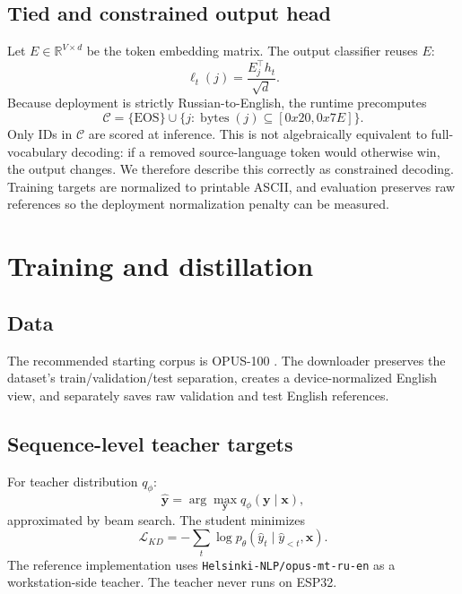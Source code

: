 \documentclass{article}
\newcommand{\R}{\mathbb{R}}
\begin{document}
\subsection{Tied and constrained output head}
Let $E\in\R^{V\times d}$ be the token embedding matrix. The output classifier reuses $E$:
\begin{equation}
\ell_t(j)=\frac{E_j^\top h_t}{\sqrt{d}}.
\end{equation}
Because deployment is strictly Russian-to-English, the runtime precomputes
\begin{equation}
\mathcal{C}
=\{\mathrm{EOS}\}\cup
\{j:\operatorname{bytes}(j)\subseteq[0x20,0x7E]\}.
\end{equation}
Only IDs in $\mathcal{C}$ are scored at inference. This is not algebraically equivalent to full-vocabulary decoding: if a removed source-language token would otherwise win, the output changes. We therefore describe this correctly as constrained decoding. Training targets are normalized to printable ASCII, and evaluation preserves raw references so the deployment normalization penalty can be measured.

\section{Training and distillation}
\subsection{Data}
The recommended starting corpus is OPUS-100 \citep{zhang2020opus100,hf_opus100}. The downloader preserves the dataset's train/validation/test separation, creates a device-normalized English view, and separately saves raw validation and test English references.

\subsection{Sequence-level teacher targets}
For teacher distribution $q_\phi$:
\begin{equation}
\hat{\mathbf{y}}
=\arg\max_{\mathbf{y}}q_\phi(\mathbf{y}\mid\mathbf{x}),
\end{equation}
approximated by beam search. The student minimizes
\begin{equation}
\mathcal{L}_{KD}
=-\sum_t\log p_\theta(
\hat y_t\mid\hat y_{<t},\mathbf{x}).
\end{equation}
The reference implementation uses \texttt{Helsinki-NLP/opus-mt-ru-en} as a workstation-side teacher. The teacher never runs on ESP32.
\end{document}
